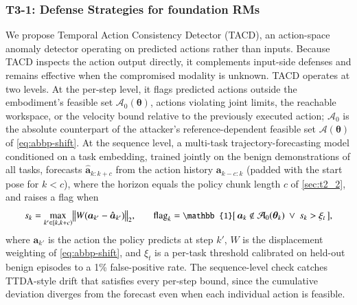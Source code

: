 \documentclass[11pt,letterpaper]{article}
\begin{document}
\subsubsection{T3-1: Defense Strategies for foundation RMs}\label{sec:t3_1}


 We propose Temporal Action Consistency Detector (TACD), an action-space anomaly detector operating on predicted actions rather than inputs. Because TACD inspects the action output directly, it complements input-side defenses and remains effective when the compromised modality is unknown. TACD operates at two levels. At the per-step level, it flags predicted actions outside the embodiment's feasible set $\mathcal{A}_0(\bm{\theta})$, \ie actions violating joint limits, the reachable workspace, or the velocity bound relative to the previously executed action; $\mathcal{A}_0$ is the absolute counterpart of the attacker's reference-dependent feasible set $\mathcal{A}(\bm{\theta})$ of \autoref{eq:abbp-shift}. 
At the sequence level, a multi-task trajectory-forecasting model conditioned on a task embedding, trained jointly on the benign demonstrations of all tasks, forecasts $\hat{\bm{a}}_{k:k+c}$ from the action history $\bm{a}_{k-c:k}$ (padded with the start pose for $k<c$), where the horizon equals the policy chunk length $c$ of \autoref{sec:t2_2}, and raises a flag when
\vspace{-2.5ex}\begin{equation}
  \small
s_k=\max_{k'\in[k,k+c)} \bigl\|W\bigl(\bm{a}_{k'}-\hat{\bm{a}}_{k'}\bigr)\bigr\|_{2},
\qquad
\mathrm{flag}_k=\mathbb{1}\bigl[\,\bm{a}_k\notin\mathcal{A}_0(\bm{\theta}_k)\ \lor\ s_k>\xi_t\,\bigr],
\label{eq:tacd-rule}
\vspace{-1.5ex}\end{equation}
where $\bm{a}_{k'}$ is the action the policy predicts at step $k'$, $W$ is the displacement weighting of \autoref{eq:abbp-shift}, and $\xi_t$ is a per-task threshold calibrated on held-out benign episodes to a 1\% false-positive rate. The sequence-level check catches TTDA-style drift that satisfies every per-step bound, since the cumulative deviation diverges from the forecast even when each individual action is feasible.
\end{document}
